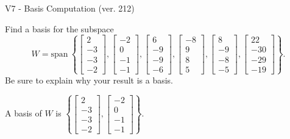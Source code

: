 \begin{exercise}
  \begin{exerciseTitle}V7 - Basis Computation (ver. 212)\end{exerciseTitle}
  \begin{exerciseStatement}
    Find a basis for the subspace 
\[W=\mathrm{span}\ \left\{\left[\begin{array}{r}
2 \\
-3 \\
-3 \\
-2
\end{array}\right] , \left[\begin{array}{r}
-2 \\
0 \\
-1 \\
-1
\end{array}\right] , \left[\begin{array}{r}
6 \\
-9 \\
-9 \\
-6
\end{array}\right] , \left[\begin{array}{r}
-8 \\
9 \\
8 \\
5
\end{array}\right] , \left[\begin{array}{r}
8 \\
-9 \\
-8 \\
-5
\end{array}\right] , \left[\begin{array}{r}
22 \\
-30 \\
-29 \\
-19
\end{array}\right]\right\}.\]
 Be sure to explain why your result is a basis.


  \end{exerciseStatement}
  \begin{exerciseAnswer}
   A basis of \(W\) is  \(\left\{\left[\begin{array}{r}
2 \\
-3 \\
-3 \\
-2
\end{array}\right] , \left[\begin{array}{r}
-2 \\
0 \\
-1 \\
-1
\end{array}\right]\right\}\).
  


  \end{exerciseAnswer}
\end{exercise}